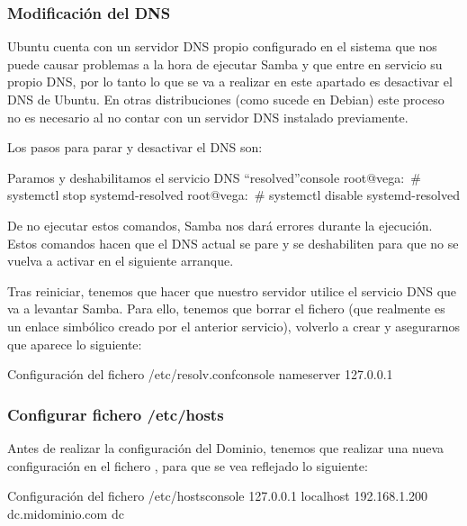 \documentclass{../../../yukibook.cls/yukibook}
\begin{document}
\subsubsection{Modificación del DNS}
Ubuntu cuenta con un servidor DNS propio configurado en el sistema que nos puede causar problemas a la hora de ejecutar Samba y que entre en servicio su propio DNS, por lo tanto lo que se va a realizar en este apartado es desactivar el DNS de Ubuntu. En otras distribuciones (como sucede en Debian) este proceso no es necesario al no contar con un servidor DNS instalado previamente.

Los pasos para parar y desactivar el DNS son:

\begin{mycode}{Paramos y deshabilitamos el servicio DNS “resolved”}{console}{}
root@vega:~# systemctl stop systemd-resolved
root@vega:~# systemctl disable systemd-resolved
\end{mycode}

De no ejecutar estos comandos, Samba nos dará errores durante la ejecución. Estos comandos hacen que el DNS actual se pare y se deshabiliten para que no se vuelva a activar en el siguiente arranque.


Tras reiniciar, tenemos que hacer que nuestro servidor utilice el servicio DNS que va a levantar Samba. Para ello, tenemos que borrar el fichero    (que realmente es un enlace simbólico creado por el anterior servicio), volverlo a crear y  asegurarnos que aparece lo siguiente:

\begin{mycode}{Configuración del fichero  \faFile \hspace{1pt} /etc/resolv.conf}{console}{}
nameserver 127.0.0.1
\end{mycode}


\subsubsection{Configurar fichero /etc/hosts}
Antes de realizar la configuración del Dominio, tenemos que realizar una nueva configuración en el fichero   , para que se vea reflejado lo siguiente:

\begin{mycode}{Configuración del fichero  \faFile \hspace{1pt} /etc/hosts}{console}{}
127.0.0.1      localhost
192.168.1.200  dc.midominio.com dc
\end{mycode}
\end{document}
